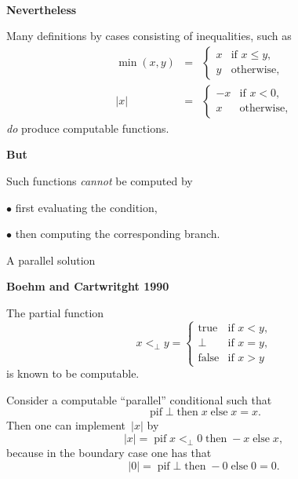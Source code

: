 \documentclass{csslides-1.1}
\newcommand{\True}{\operatorname{true}}
\newcommand{\False}{\operatorname{false}}
\newcommand{\myemph}[1]{{\it #1}\/}
\begin{document}
\begin{slide}{}

~

\vfill

{\bf Nevertheless}

Many definitions by cases consisting of inequalities,
  such as
\begin{eqnarray*}
\min(x,y)  & =  & \begin{cases}
                    x & \text{if $x \leqslant y$,} \\
                    y & \text{otherwise,}
                    \end{cases} \\[2ex]
|x| & =  & \begin{cases}
                    -x & \text{if $x < 0$,} \\
                    x & \text{otherwise,}
                    \end{cases}\end{eqnarray*}  
\myemph{do} produce computable functions. 

\vfill

{\bf But}

Such functions \myemph{cannot} be computed by 

$\bullet$ first evaluating the condition, 

$\bullet$ then computing the corresponding branch.

\vfill

\end{slide}

\begin{slide}{A parallel solution}

{\bf Boehm and Cartwritght 1990}

The partial function
\[
x <_{\bot} y = \begin{cases}
                    \True & \text{if $x < y$,} \\
                    \bot & \text{if $x=y$,} \\
                    \False & \text{if $x > y$} 
                    \end{cases}
\]
is known to be computable.

Consider a computable ``parallel'' conditional such that
\[
\operatorname{pif} \bot \operatorname{then} x \operatorname{else} x = x.
\]
Then one can implement~$|x|$ by
\[
|x| = \operatorname{pif} x <_{\bot} 0 \operatorname{then} -x 
\operatorname{else} x,
\]
because in the boundary case one has that
\[
|0| = \operatorname{pif} \bot \operatorname{then} -0 \operatorname{else} 0 = 0.
\]
\end{slide}
\end{document}
